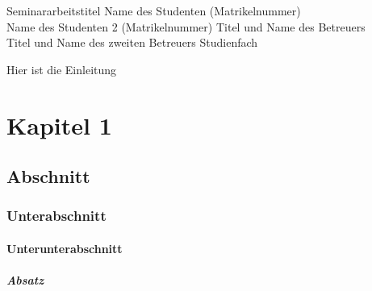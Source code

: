 \documentclass[xlevel, hyperref, mp, nat]{fgdh-thesis}
\begin{document}
\seminartitlepage
{Seminararbeitstitel}
{Name des Studenten (Matrikelnummer) \\ Name des Studenten 2 (Matrikelnummer)}
{Titel und Name des Betreuers \\ Titel und Name des zweiten Betreuers}
{Studienfach}

\begin{preface}
  \abstract
  

  \tableofcontents
\end{preface}

\introduction

Hier ist die Einleitung


\section{Kapitel 1}
\label{sec:kapitel1}





\subsection{Abschnitt}
\label{sec:abschnitt}


\subsubsection{Unterabschnitt}
\label{sec:unterabschnitt}


\paragraph{Unterunterabschnitt}
\label{sec:unterunterabschnitt}

\subparagraph{Absatz}
\label{sec:absatz}
\end{document}
